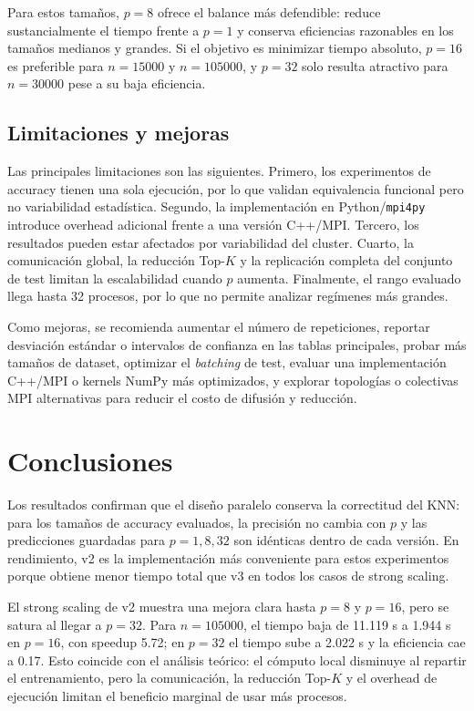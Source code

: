 \documentclass[11pt,a4paper]{article}
\begin{document}
Para estos tamaños, $p=8$ ofrece el balance más defendible: reduce sustancialmente el tiempo
frente a $p=1$ y conserva eficiencias razonables en los tamaños medianos y grandes. Si el objetivo
es minimizar tiempo absoluto, $p=16$ es preferible para $n=15000$ y $n=105000$, y $p=32$ solo
resulta atractivo para $n=30000$ pese a su baja eficiencia.

\subsection{Limitaciones y mejoras}

Las principales limitaciones son las siguientes. Primero, los experimentos de accuracy tienen una
sola ejecución, por lo que validan equivalencia funcional pero no variabilidad estadística.
Segundo, la implementación en Python/\texttt{mpi4py} introduce overhead adicional frente a una
versión C++/MPI. Tercero, los resultados pueden estar afectados por variabilidad del cluster.
Cuarto, la comunicación global, la reducción Top-$K$ y la replicación completa del conjunto de
test limitan la escalabilidad cuando $p$ aumenta. Finalmente, el rango evaluado llega hasta
32 procesos, por lo que no permite analizar regímenes más grandes.

Como mejoras, se recomienda aumentar el número de repeticiones, reportar desviación estándar o
intervalos de confianza en las tablas principales, probar más tamaños de dataset, optimizar el
\textit{batching} de test, evaluar una implementación C++/MPI o kernels NumPy más optimizados,
y explorar topologías o colectivas MPI alternativas para reducir el costo de difusión y reducción.

\section{Conclusiones}

Los resultados confirman que el diseño paralelo conserva la correctitud del KNN: para los tamaños
de accuracy evaluados, la precisión no cambia con $p$ y las predicciones guardadas para $p=1,8,32$
son idénticas dentro de cada versión. En rendimiento, v2 es la implementación más conveniente para
estos experimentos porque obtiene menor tiempo total que v3 en todos los casos de strong scaling.

El strong scaling de v2 muestra una mejora clara hasta $p=8$ y $p=16$, pero se satura al llegar a
$p=32$. Para $n=105000$, el tiempo baja de 11.119 s a 1.944 s en $p=16$, con speedup 5.72; en
$p=32$ el tiempo sube a 2.022 s y la eficiencia cae a 0.17. Esto coincide con el análisis teórico:
el cómputo local disminuye al repartir el entrenamiento, pero la comunicación, la reducción Top-$K$
y el overhead de ejecución limitan el beneficio marginal de usar más procesos.
\end{document}
